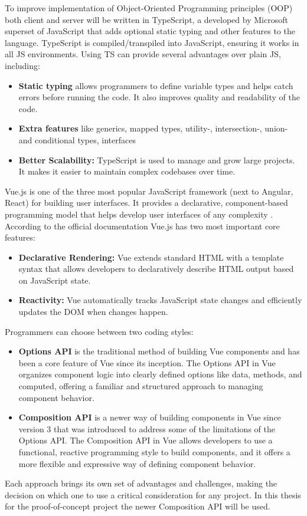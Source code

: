 To improve implementation of Object-Oriented Programming principles (OOP) both client and server will be written in TypeScript, a developed by Microsoft superset of JavaScript that adds optional static typing and other features to the language. TypeScript is compiled/transpiled into JavaScript, ensuring it works in all JS environments. Using TS can provide several advantages over plain JS, including:
\begin{itemize}
    \item \textbf{Static typing} allows programmers to define variable types and helps catch errors before running the code. It also improves quality and readability of the code.
    \item \textbf{Extra features} like generics, mapped types, utility-, intersection-, union- and conditional types, interfaces
    \item \textbf{Better Scalability:} TypeScript is used to manage and grow large projects. It makes it easier to maintain complex codebases over time.
\end{itemize}
\autocite{TSDoc} \autocite{TSfeatures}
\newline

Vue.js is one of the three most popular JavaScript framework (next to Angular, React) for building user  interfaces. It provides a declarative, component-based programming model that helps develop user interfaces of any complexity \autocite{VueDoc}. According to the official documentation Vue.js has two most important core features:
\begin{itemize}
    \item \textbf{Declarative Rendering:} Vue extends standard HTML with a template syntax that allows developers to declaratively describe HTML output based on JavaScript state.
    \item \textbf{Reactivity:} Vue automatically tracks JavaScript state changes and efficiently updates the DOM when changes happen.
\end{itemize}


Programmers can choose between two coding styles:
\begin{itemize}
    \item \textbf{Options API} is the traditional method of building Vue components and has been a core feature of Vue since its inception. The Options API in Vue organizes component logic into clearly defined options like data, methods, and computed, offering a familiar and structured approach to managing component behavior.
    \item \textbf{Composition API} is a newer way of building components in Vue since version 3 that was introduced to address some of the limitations of the Options API. The Composition API in Vue allows developers to use a functional, reactive programming style to build components, and it offers a more flexible and expressive way of defining component behavior.
\end{itemize}
Each approach brings its own set of advantages and challenges, making the decision on which one to use a critical consideration for any project. In this thesis for the proof-of-concept project the newer Composition API will be used.

